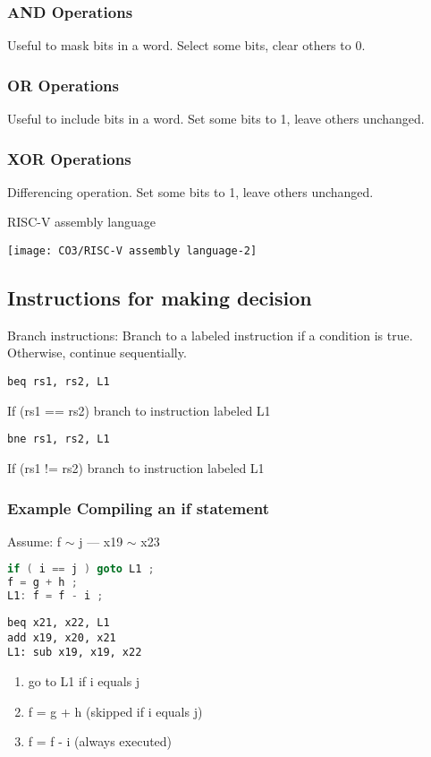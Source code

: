 \subsubsection{AND Operations}
Useful to mask bits in a word. Select some bits, clear others to 0. 

\subsubsection{OR Operations}
Useful to include bits in a word. Set some bits to 1, leave others unchanged. 

\subsubsection{XOR Operations}
Differencing operation. Set some bits to 1, leave others unchanged. 

\begin{table}[!htb]
    \centering
    \caption{RISC-V assembly language}
    \texttt{[image: CO3/RISC-V assembly language-2]}
\end{table}


\subsection{Instructions for making decision}
Branch instructions: Branch to a labeled instruction if a condition is true. Otherwise, continue sequentially. 

\begin{lstlisting}[language={[x86masm]Assembler}]
beq rs1, rs2, L1 
\end{lstlisting}
If (rs1 == rs2) branch to instruction labeled L1

\begin{lstlisting}[language={[x86masm]Assembler}]
bne rs1, rs2, L1 
\end{lstlisting}
If (rs1 != rs2) branch to instruction labeled L1

\subsubsection{Example Compiling an if statement}
Assume: f $\sim$ j --- x19 $\sim$ x23
\begin{lstlisting}[language={c},title={C code}]
if ( i == j ) goto L1 ;
f = g + h ;
L1: f = f - i ;
\end{lstlisting}

\begin{lstlisting}[language={[x86masm]Assembler},title={RISC-V assembly code}]
beq x21, x22, L1
add x19, x20, x21
L1: sub x19, x19, x22
\end{lstlisting}
\begin{enumerate}
    \item go to L1 if i equals j
    \item f = g + h (skipped if i equals j)
    \item f = f - i (always executed)
\end{enumerate}

